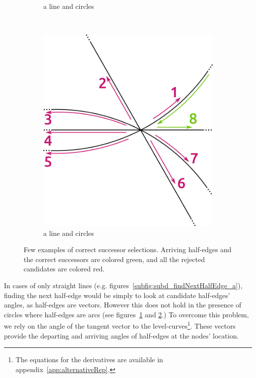 \begin{figure}
\begin{subfigure}{.32\textwidth}
    \caption{a line and circles} \label{subfig:subd_findNextHalfEdge_b}
  \end{subfigure}%
  ~%
  \begin{subfigure}{.32\textwidth}
    \includegraphics[width=\textwidth]{figures/subd_findNextHalfEdge_c.png}
    \caption{a line and circles} \label{subfig:subd_findNextHalfEdge_c}
  \end{subfigure}%
  \caption[xxx]
          {Few examples of correct successor selections.
            Arriving half-edges and the correct successors are colored green, and all the rejected candidates are colored red.}
  \label{fig:subd_findNextHalfEdge}
\end{figure}

In cases of only straight lines (e.g. figures~\ref{subfig:subd_findNextHalfEdge_a}), finding the next half-edge would be simply to look at candidate half-edges' angles, as half-edges are vectors.
However this does not hold in the presence of circles where half-edges are arcs (see figures~\ref{subfig:subd_findNextHalfEdge_b} and \ref{subfig:subd_findNextHalfEdge_c}.)
To overcome this problem, we rely on the angle of the tangent vector to the level-curves\footnote{The equations for the derivatives are available in appendix~\ref{app:alternativeRep}.}.
These vectors provide the departing and arriving angles of half-edges at the nodes' location.


